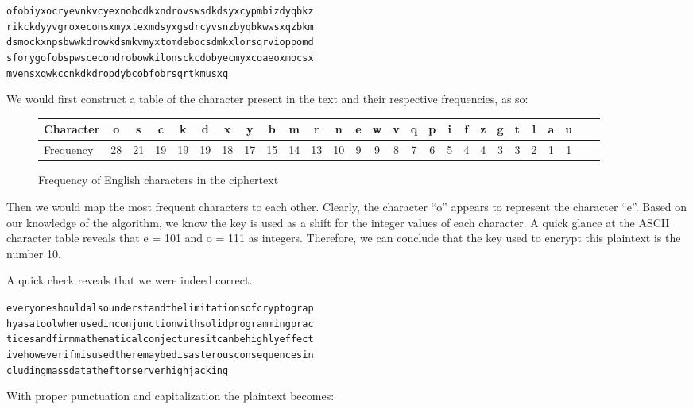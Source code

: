 \documentclass[12pt, a4paper, draft]{report}
\begin{document}
\begin{alltt}
ofobiyxocryevnkvcyexnobcdkxndrovswsdkdsyxcypmbizdyqbkz
rikckdyyvgroxeconsxmyxtexmdsyxgsdrcyvsnzbyqbkwwsxqzbkm
dsmockxnpsbwwkdrowkdsmkvmyxtomdebocsdmkxlorsqrvioppomd
sforygofobspwscecondrobowkilonsckcdobyecmyxcoaeoxmocsx
mvensxqwkccnkdkdropdybcobfobrsqrtkmusxq
\end{alltt}

We would first construct a table of the character present in the text and
their respective frequencies, as so:

\begin{figure}[h]
\begin{center}
\begin{tabular}{l*{26}{c}}
\toprule
Character & o & s & c & k & d & x & y & b & m & r & n & e & w & v & q & p & i & f & z & g & t & l & a & u\\
\midrule
Frequency & 28 & 21 & 19 & 19 & 19 & 18 & 17 & 15 & 14 & 13 & 10 & 9 & 9 & 8 & 7 & 6 & 5 & 4 & 4 & 3 & 3 & 2 & 1 & 1\\
\bottomrule
\end{tabular}
\end{center}
\caption{Frequency of English characters in the ciphertext}
\end{figure}

Then we would map the most frequent characters to each other.
Clearly, the character ``o'' appears to represent the character ``e''.
Based on our knowledge of the algorithm, we know the key is used as
a shift for the integer values of each character. A quick glance at the
ASCII character table reveals that e = 101 and o = 111 as integers.
Therefore, we can conclude that the key used to encrypt this plaintext
is the number 10.

\pagebreak
A quick check reveals that we were indeed correct.

\begin{alltt}
everyoneshouldalsounderstandthelimitationsofcryptograp
hyasatoolwhenusedinconjunctionwithsolidprogrammingprac
ticesandfirmmathematicalconjecturesitcanbehighlyeffect
ivehoweverifmisusedtheremaybedisasterousconsequencesin
cludingmassdatatheftorserverhighjacking
\end{alltt}


With proper punctuation and capitalization the plaintext becomes:
\end{document}
